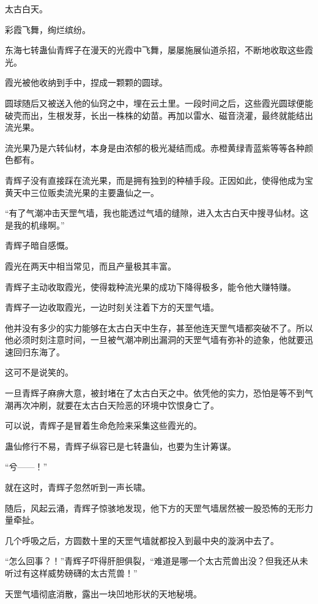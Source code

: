 
\begin{this_body}

太古白天。

彩霞飞舞，绚烂缤纷。

东海七转蛊仙青辉子在漫天的光霞中飞舞，屡屡施展仙道杀招，不断地收取这些霞光。

霞光被他收纳到手中，捏成一颗颗的圆球。

圆球随后又被送入他的仙窍之中，埋在云土里。一段时间之后，这些霞光圆球便能破壳而出，生根发芽，长出一株株的幼苗。再加以雷水、磁音浇灌，最终就能结出流光果。

流光果乃是六转仙材，本身是由浓郁的极光凝结而成。赤橙黄绿青蓝紫等等各种颜色都有。

青辉子没有直接踩在流光果，而是拥有独到的种植手段。正因如此，使得他成为宝黄天中三位贩卖流光果的主要蛊仙之一。

“有了气潮冲击天罡气墙，我也能透过气墙的缝隙，进入太古白天中搜寻仙材。这是我的机缘啊。”

青辉子暗自感慨。

霞光在两天中相当常见，而且产量极其丰富。

青辉子主动收取霞光，使得栽种流光果的成功下降得极多，能令他大赚特赚。

青辉子一边收取霞光，一边时刻关注着下方的天罡气墙。

他并没有多少的实力能够在太古白天中生存，甚至他连天罡气墙都突破不了。所以他必须时刻注意时间，一旦被气潮冲刷出漏洞的天罡气墙有弥补的迹象，他就要迅速回归东海了。

这可不是说笑的。

一旦青辉子麻痹大意，被封堵在了太古白天之中。依凭他的实力，恐怕是等不到气潮再次冲刷，就要在太古白天险恶的环境中饮恨身亡了。

可以说，青辉子是冒着生命危险来采集这些霞光的。

蛊仙修行不易，青辉子纵容已是七转蛊仙，也要为生计筹谋。

“兮——！”

就在这时，青辉子忽然听到一声长啸。

随后，风起云涌，青辉子惊骇地发现，他下方的天罡气墙居然被一股恐怖的无形力量牵扯。

几个呼吸之后，方圆数十里的天罡气墙就都投入到最中央的漩涡中去了。

“怎么回事？！”青辉子吓得肝胆俱裂，“难道是哪一个太古荒兽出没？但我还从未听过有这样威势磅礴的太古荒兽！”

天罡气墙彻底消散，露出一块凹地形状的天地秘境。


\end{this_body}
